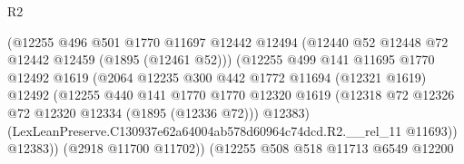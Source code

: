 \begin{lexlean}{R2}
\begin{coremodule}
                                        (@12255
                                          @496
                                          @501
                                          @1770
                                          @11697
                                          @12442
                                          @12494
                                          (@12440 @52 @12448 @72 @12442 @12459 (@1895 (@12461 @52)))
                                          (@12255
                                            @499
                                            @141
                                            @11695
                                            @1770
                                            @12492
                                            @1619
                                            (@2064
                                              @12235
                                              @300
                                              @442
                                              @1772
                                              @11694
                                              (@12321 @1619)
                                              @12492
                                              (@12255
                                                @440
                                                @141
                                                @1770
                                                @1770
                                                @12320
                                                @1619
                                                (@12318
                                                  @72
                                                  @12326
                                                  @72
                                                  @12320
                                                  @12334
                                                  (@1895 (@12336 @72)))
                                                @12383)
                                              (LexLeanPreserve.C130937e62a64004ab578d60964c74dcd.R2.__rel_11
                                                @11693))
                                            @12383))
                                        (@2918 @11700 @11702))
                                      (@12255
                                        @508
                                        @518
                                        @11713
                                        @6549
                                        @12200

\end{coremodule}
\end{lexlean}
